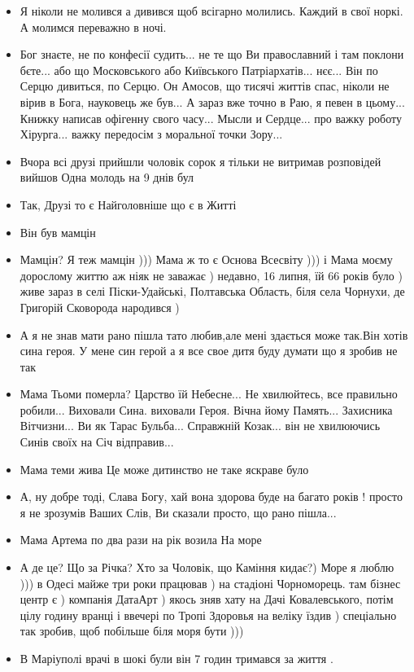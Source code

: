 \begin{itemize}
\item Я ніколи не молився а дивився щоб всігарно молились. Каждий в свої
				норкі. А молимся переважно в ночі.
\item Бог знаєте, не по конфесії судить... не те що Ви православний і там
				поклони бєте... або що Московського або Київського Патріархатів...
				нєє... Він по Серцю дивиться, по Серцю. Он Амосов, що тисячі життів
				спас, ніколи не вірив в Бога, науковець же був... А зараз вже точно в
				Раю, я певен в цьому...  Книжку написав офігенну свого часу... Мысли и
				Сердце... про важку роботу Хірурга... важку передосім з моральної точки
				Зору...
\item Вчора всі друзі прийшли чоловік сорок я тільки не витримав розповідей
				вийшов Одна молодь на 9 днів бул
\item Так, Друзі то є Найголовніше що є в Житті
\item Він був мамцін
\item Мамцін? Я теж мамцін ))) Мама ж то є Основа Всесвіту ))) і Мама
моєму дорослому життю аж ніяк не заважає ) недавно, 16 липня,
їй 66 років було ) живе зараз в селі Піски-Удайські, Полтавська
Область, біля села Чорнухи, де Григорій Сковорода народився )
\item А я не знав мати рано пішла тато любив,але мені здається може так.Він хотів сина героя.
У мене син герой а я все свое дитя буду думати що я зробив не так
\item Мама Тьоми померла? Царство їй Небесне... Не хвилюйтесь, все правильно робили... Виховали Сина. виховали Героя.  Вічна йому Память... Захисника Вітчизни... Ви як Тарас Бульба... Справжній Козак... він не хвилюючись Синів своїх на Січ відправив...
\item Мама теми жива
Це може дитинство не таке яскраве було
\item А, ну добре тоді, Слава Богу, хай вона здорова буде на багато років ! просто я не зрозумів Ваших Слів, Ви сказали просто, що рано пішла...
\item Мама Артема по два рази на рік возила
На море
\item А де це? Що за Річка? Хто за Чоловік, що Каміння кидає?)
Море я люблю ))) в Одесі майже три роки працював ) на стадіоні Чорноморець. там бізнес центр є ) компанія ДатаАрт ) якось зняв хату на Дачі Ковалевського, потім цілу годину вранці і ввечері по Тропі Здоровья на веліку їздив ) спеціально так зробив, щоб побільше біля моря бути )))
\item В Маріуполі врачі в шокі були він 7 годин тримався за життя .

\end{itemize}
